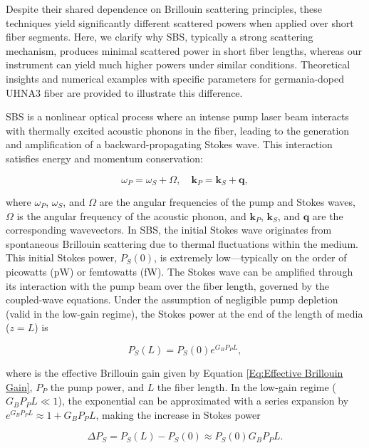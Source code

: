 \documentclass[%
  reprint,
  superscriptaddress,
  amsmath,amssymb,
  aps,
  prapplied,
]{revtex4-2}
\begin{document}
Despite their shared dependence on Brillouin scattering principles, these techniques yield significantly different scattered powers when applied over short fiber segments. Here, we clarify why SBS, typically a strong scattering mechanism, produces minimal scattered power in short fiber lengths, whereas our instrument can yield much higher powers under similar conditions. Theoretical insights and numerical examples with specific parameters for germania-doped UHNA3 fiber are provided to illustrate this difference.

SBS is a nonlinear optical process where an intense pump laser beam interacts with thermally excited acoustic phonons in the fiber, leading to the generation and amplification of a backward-propagating Stokes wave. This interaction satisfies energy and momentum conservation:

\begin{equation}
\omega_{P} = \omega_{S} + \Omega, \quad \mathbf{k}_{P} = \mathbf{k}_{S} + \mathbf{q},
\end{equation}

where $\omega_{P}$, $\omega_{S}$, and $\Omega$ are the angular frequencies of the pump and Stokes waves, $\Omega$ is the angular frequency of the acoustic phonon, and $\mathbf{k}_{P}$, $\mathbf{k}_{S}$, and $\mathbf{q}$ are the corresponding wavevectors. In SBS, the initial Stokes wave originates from spontaneous Brillouin scattering due to thermal fluctuations within the medium. This initial Stokes power, $P_{S}(0)$, is extremely low—typically on the order of picowatts (pW) or femtowatts (fW). The Stokes wave can be amplified through its interaction with the pump beam over the fiber length, governed by the coupled-wave equations. Under the assumption of negligible pump depletion (valid in the low-gain regime), the Stokes power at the end of the length of media ($z = L$) is

\begin{equation}
P_{S}(L) = P_{S}(0) e^{G_{B} P_{P} L},
\end{equation}

where is the effective Brillouin gain given by Equation \ref{Eq:Effective Brillouin Gain}, $P_{P}$ the pump power, and $L$ the fiber length. In the low-gain regime ($G_{B} P_{P} L \ll 1$), the exponential can be approximated with a series expansion by $e^{G_{B}P_{P}L} \approx 1 + G_{B}P_{P}L$, making the increase in Stokes power

\begin{equation}
\Delta P_S = P_S(L) - P_S(0) \approx P_S(0) G_{B}P_{P}L.
\end{equation}
\end{document}
